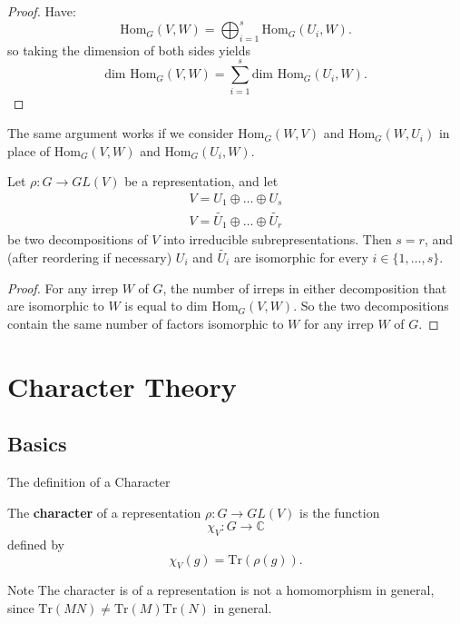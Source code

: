 \begin{frame}
\begin{proof}
Have:  \[ \text{Hom}_G(V,W) = \bigoplus_{i=1}^s \text{Hom}_G(U_i, W) .\]
 so taking the dimension of both sides yields \[  \text{dim Hom}_G(V,W) = \sum_{i=1}^s \text{dim Hom}_G(U_i, W). \]
\end{proof}
\end{frame}
\begin{note}
The same argument works if we consider $\text{Hom}_G(W,V)$ and $\text{Hom}_G(W,U_i)$ in place of $\text{Hom}_G(V,W)$ and $\text{Hom}_G(U_i,W)$.
\end{note}

\begin{frame}
\begin{theorem}
Let $\rho \colon G \to GL(V)$ be a representation, and let
\begin{align*}
V = U_1 \oplus \ldots \oplus U_s \\
V = \widetilde{U_1} \oplus \ldots \oplus \widetilde{U_r}
\end{align*}
be two decompositions of $V$ into irreducible subrepresentations.  Then $s = r$, and (after reordering if necessary) $U_i$ and $\widetilde{U_i}$ are isomorphic for every $i \in \{1, \ldots, s\}$.
\end{theorem}
\begin{proof}
For any irrep $W$ of $G$, the number of irreps in either decomposition that are isomorphic to $W$ is equal to $\text{dim Hom}_G(V,W)$.  So the two decompositions contain the same number of factors isomorphic to $W$ for any irrep $W$ of $G$.
\end{proof}
\end{frame}

\section{Character Theory}
\subsection{Basics}
\begin{frame}{The definition of a Character}
\begin{definition}
The \textbf{character} of a representation $\rho \colon G \to GL(V)$ is the function \[ \chi_V \colon G \to \mathbb{C}\] defined by \[\chi_V(g) = \text{Tr}(\rho(g)).\]
\end{definition}
\begin{block}{Note}
The character is of a representation is not a homomorphism in general, since $\text{Tr}(MN) \neq \text{Tr}(M) \text{Tr}(N)$ in general.
\end{block}
\end{frame}

